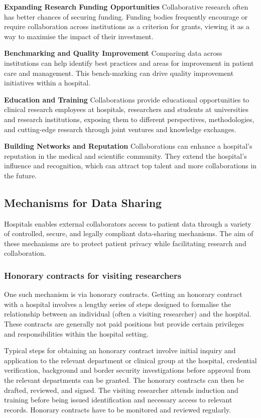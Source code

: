 \documentclass[11pt]{article}
\begin{document}
\textbf{Expanding Research Funding Opportunities} Collaborative research often has better chances of securing funding. Funding bodies frequently encourage or require collaboration across institutions as a criterion for grants, viewing it as a way to maximise the impact of their investment.

\textbf{Benchmarking and Quality Improvement} Comparing data across institutions can help identify best practices and areas for improvement in patient care and management. This bench-marking can drive quality improvement initiatives within a hospital.

\textbf{Education and Training} Collaborations provide educational opportunities to clinical research employees at hospitals, researchers and students at universities and research institutions, exposing them to different perspectives, methodologies, and cutting-edge research through joint ventures and knowledge exchanges.

\textbf{Building Networks and Reputation} Collaborations can enhance a hospital’s reputation in the medical and scientific community. They extend the hospital’s influence and recognition, which can attract top talent and more collaborations in the future.

\subsection{Mechanisms for Data Sharing}

Hospitals enables external collaborators access to patient data through a variety of controlled, secure, and legally compliant data-sharing mechanisms. The aim of these mechanisms are to protect patient privacy while facilitating research and collaboration. 

\subsubsection{Honorary contracts for visiting researchers}

One such mechanism is via honorary contracts. Getting an honorary contract with a hospital involves a lengthy series of steps designed to formalise the relationship between an individual (often a visiting researcher) and the hospital. These contracts are generally not paid positions but provide certain privileges and responsibilities within the hospital setting. 

Typical steps for obtaining an honorary contract involve initial inquiry and application to the relevant department or clinical group at the hospital, credential verification, background and border security investigations before approval from the relevant departments can be granted. The honorary contracts can then be drafted, reviewed, and signed. The visiting researcher attends induction and training before being issued identification and necessary access to relevant records. Honorary contracts have to be monitored and reviewed regularly. 
\end{document}
